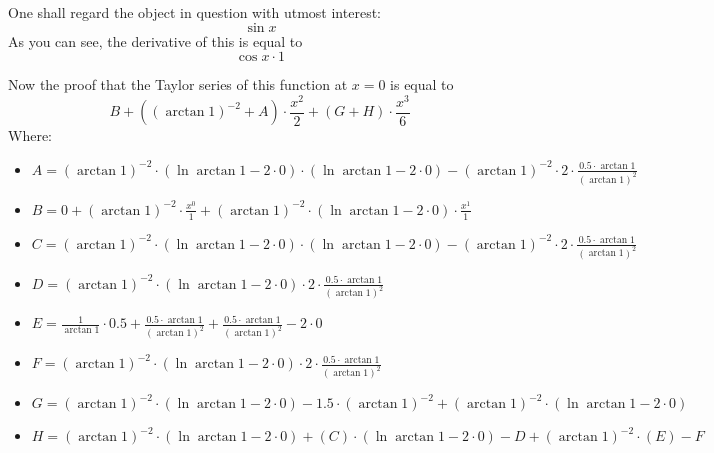 \documentclass{article}
\begin{document}
One shall regard the object in question with utmost interest:
\begin{equation}
\sin x 
\end{equation}
As you can see, the derivative of this is equal to
\begin{equation}
\cos x \cdot 1 
\end{equation}

Now the proof that the Taylor series of this function at $x = 0$ is equal to
\begin{equation}
B + \left( \left( \arctan 1 \right) ^{-2 } + A \right) \cdot \frac{x ^{2 } }{2 } + \left( G + H \right) \cdot \frac{x ^{3 } }{6 } 
\end{equation}
Where:
\begin{itemize}
	\item $A = \left( \arctan 1 \right) ^{-2 } \cdot \left( \ln \arctan 1 - 2 \cdot 0 \right) \cdot \left( \ln \arctan 1 - 2 \cdot 0 \right) - \left( \arctan 1 \right) ^{-2 } \cdot 2 \cdot \frac{0.5 \cdot \arctan 1 }{\left( \arctan 1 \right) ^{2 } } $
	\item $B = 0 + \left( \arctan 1 \right) ^{-2 } \cdot \frac{x ^{0 } }{1 } + \left( \arctan 1 \right) ^{-2 } \cdot \left( \ln \arctan 1 - 2 \cdot 0 \right) \cdot \frac{x ^{1 } }{1 } $
	\item $C = \left( \arctan 1 \right) ^{-2 } \cdot \left( \ln \arctan 1 - 2 \cdot 0 \right) \cdot \left( \ln \arctan 1 - 2 \cdot 0 \right) - \left( \arctan 1 \right) ^{-2 } \cdot 2 \cdot \frac{0.5 \cdot \arctan 1 }{\left( \arctan 1 \right) ^{2 } } $
	\item $D = \left( \arctan 1 \right) ^{-2 } \cdot \left( \ln \arctan 1 - 2 \cdot 0 \right) \cdot 2 \cdot \frac{0.5 \cdot \arctan 1 }{\left( \arctan 1 \right) ^{2 } } $
	\item $E = \frac{1 }{\arctan 1 } \cdot 0.5 + \frac{0.5 \cdot \arctan 1 }{\left( \arctan 1 \right) ^{2 } } + \frac{0.5 \cdot \arctan 1 }{\left( \arctan 1 \right) ^{2 } } - 2 \cdot 0 $
	\item $F = \left( \arctan 1 \right) ^{-2 } \cdot \left( \ln \arctan 1 - 2 \cdot 0 \right) \cdot 2 \cdot \frac{0.5 \cdot \arctan 1 }{\left( \arctan 1 \right) ^{2 } } $
	\item $G = \left( \arctan 1 \right) ^{-2 } \cdot \left( \ln \arctan 1 - 2 \cdot 0 \right) - 1.5 \cdot \left( \arctan 1 \right) ^{-2 } + \left( \arctan 1 \right) ^{-2 } \cdot \left( \ln \arctan 1 - 2 \cdot 0 \right) $
	\item $H = \left( \arctan 1 \right) ^{-2 } \cdot \left( \ln \arctan 1 - 2 \cdot 0 \right) + \left( C \right) \cdot \left( \ln \arctan 1 - 2 \cdot 0 \right) - D + \left( \arctan 1 \right) ^{-2 } \cdot \left( E \right) - F $
\end{itemize}
\end{document}
